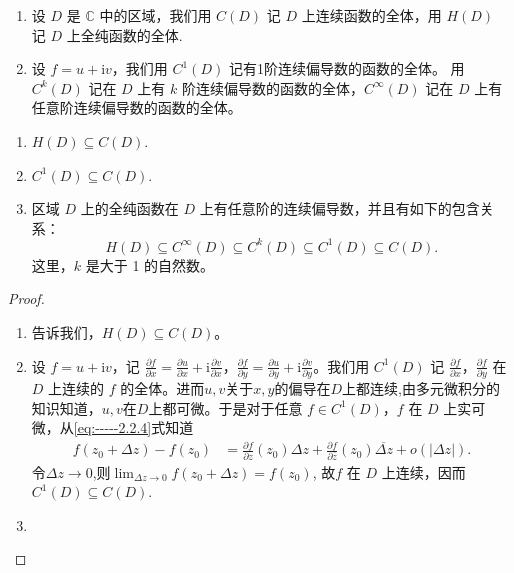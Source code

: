 \documentclass[../../main.tex]{subfiles}%
\begin{document}
\begin{definition}
\begin{enumerate}
\item 设 \( D \) 是 \( \mathbb{C} \) 中的区域，我们用 \( C(D) \) 记 \( D \) 上连续函数的全体，用 \( H(D) \) 记 \( D \) 上全纯函数的全体.

\item 设 \( f = u + \mathrm{i}v \)，我们用 \( C^1(D) \) 记有1阶连续偏导数的函数的全体。
用 \( C^k(D) \) 记在 \( D \) 上有 \( k \) 阶连续偏导数的函数的全体，\( C^\infty(D) \) 记在 \( D \) 上有任意阶连续偏导数的函数的全体。
\end{enumerate}
\end{definition}

\begin{proposition}\label{proposition:全纯函数必任意连续可微}
\begin{enumerate}[(1)]
\item \( H(D) \subseteq C(D) \).

\item $C^1(D) \subseteq C(D).$

\item 区域 \( D \) 上的全纯函数在 \( D \) 上有任意阶的连续偏导数，并且有如下的包含关系：
\[
H(D) \subseteq C^\infty(D) \subseteq C^k(D) \subseteq C^1(D) \subseteq C(D).
\]
这里，\( k \) 是大于 1 的自然数。
\end{enumerate}
\end{proposition}
\begin{proof}
\begin{enumerate}[(1)]
\item {}告诉我们，\( H(D) \subseteq C(D) \)。

\item 设 \( f = u + \mathrm{i}v \)，记 \( \frac{\partial f}{\partial x} = \frac{\partial u}{\partial x} + \mathrm{i}\frac{\partial v}{\partial x} \)，\( \frac{\partial f}{\partial y} = \frac{\partial u}{\partial y} + \mathrm{i}\frac{\partial v}{\partial y} \)。我们用 \( C^1(D) \) 记 \( \frac{\partial f}{\partial x} \)，\( \frac{\partial f}{\partial y} \) 在 \( D \) 上连续的 \( f \) 的全体。进而$u,v$关于$x,y$的偏导在$D$上都连续,由多元微积分的知识知道，$u,v$在$D$上都可微。于是对于任意 \( f \in C^1(D) \)，\( f \) 在 \( D \) 上实可微，从\eqref{eq:-----2.2.4}式知道
\begin{align*}
f(z_0 + \Delta z) - f(z_0) &= \frac{\partial f}{\partial z}(z_0)\Delta z + \frac{\partial f}{\partial \overline{z}}(z_0)\overline{\Delta z} + o(|\Delta z|).
\end{align*}
令$\Delta z\to 0$,则$\lim_{\Delta z\to 0}f(z_0+\Delta z)=f(z_0)$,
故\( f \) 在 \( D \) 上连续，因而
$C^1(D) \subseteq C(D).$

\item 
\end{enumerate}
\end{proof}
\end{document}
